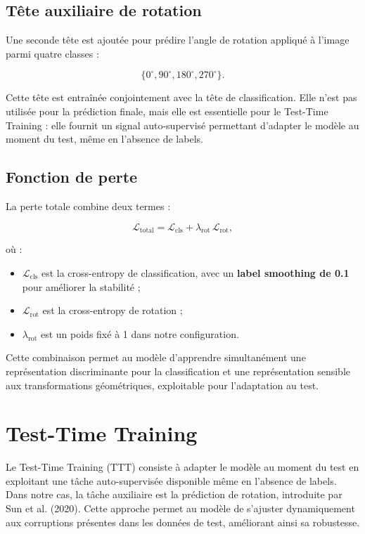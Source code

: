\documentclass[12pt,a4paper]{report}
\begin{document}
	\subsection{Tête auxiliaire de rotation}
	
	Une seconde tête est ajoutée pour prédire l’angle de rotation appliqué à l’image parmi quatre classes :
	
	
	\[
	\{0^\circ, 90^\circ, 180^\circ, 270^\circ\}.
	\]
	
	
	
	Cette tête est entraînée conjointement avec la tête de classification.  
	Elle n’est pas utilisée pour la prédiction finale, mais elle est essentielle pour le Test-Time Training :  
	elle fournit un signal auto-supervisé permettant d’adapter le modèle au moment du test, même en l’absence de labels.
	
	\subsection{Fonction de perte}
	
	La perte totale combine deux termes :
	
	
	\[
	\mathcal{L}_{\text{total}} = 
	\mathcal{L}_{\text{cls}} + \lambda_{\text{rot}} \, \mathcal{L}_{\text{rot}},
	\]
	
	
	où :
	\begin{itemize}
		\item $\mathcal{L}_{\text{cls}}$ est la cross-entropy de classification, avec un \textbf{label smoothing de 0.1} pour améliorer la stabilité ;
		\item $\mathcal{L}_{\text{rot}}$ est la cross-entropy de rotation ;
		\item $\lambda_{\text{rot}}$ est un poids fixé à 1 dans notre configuration.
	\end{itemize}
	
	Cette combinaison permet au modèle d’apprendre simultanément une représentation discriminante pour la classification et une représentation sensible aux transformations géométriques, exploitable pour l’adaptation au test.
	
	
	\section{Test-Time Training}
	
	Le Test-Time Training (TTT) consiste à adapter le modèle au moment du test en exploitant une tâche auto-supervisée disponible même en l’absence de labels. 
	Dans notre cas, la tâche auxiliaire est la prédiction de rotation, introduite par Sun et al. (2020). 
	Cette approche permet au modèle de s’ajuster dynamiquement aux corruptions présentes dans les données de test, améliorant ainsi sa robustesse.
	
\end{document}
